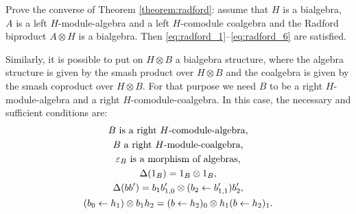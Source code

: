 \begin{exercise}
Prove the converse of Theorem \ref{theorem:radford}: assume that $H$ is a
bialgebra, $A$ is a left $H$-module-algebra and a left $H$-comodule coalgebra
and the Radford biproduct $A\otimes H$ is a bialgebra. Then
\eqref{eq:radford_1}--\eqref{eq:radford_6} are satisfied.
\end{exercise}


Similarly, it is possible to put on $H\otimes B$ a bialgebra structure, where
the algebra structure is given by the smash product over $H\otimes B$ and the
coalgebra is given by the smash coproduct over $H\otimes B$. For that purpose
we need $B$ to be a right $H$-module-algebra and a right
$H$-comodule-coalgebra. In this case, the necessary and sufficient conditions
are:
\begin{gather*}
B\text{ is a right \ensuremath{H}-comodule-algebra,}\\
B\text{ a right \ensuremath{H}-module-coalgebra,}\\
\varepsilon_{B}\text{ is a morphism of algebras,}\\
\Delta(1_{B})=1_{B}\otimes1_{B},\\
\Delta(bb')=b_{1}b'_{1,0}\otimes(b_{2}\leftarrow b'_{1,1})b'_{2},\\
(b_{0}\leftarrow h_{1})\otimes b_{1}h_{2}=(b\leftarrow h_{2})_{0}\otimes h_{1}(b\leftarrow h_{2})_{1}.\end{gather*}

